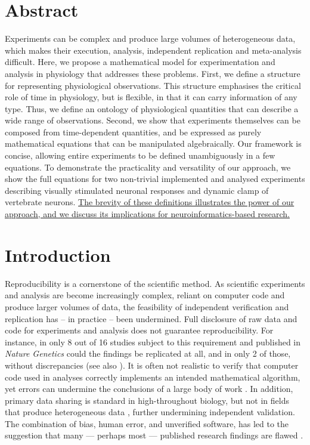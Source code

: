 
\section*{Abstract}

Experiments can be complex and produce large volumes of heterogeneous
data, which makes their execution, analysis, independent replication
and meta-analysis difficult. Here, we propose a mathematical model for
experimentation and analysis in physiology that addresses these
problems. First, we define a structure for representing physiological
observations. This structure emphasises the critical role of time in
physiology, but is flexible, in that it can carry information of any
type. Thus, we define an ontology of physiological quantities that can
describe a wide range of observations. Second, we show that
experiments themselves can be composed from time-dependent quantities,
and be expressed as purely mathematical equations that can be
manipulated algebraically. Our framework is concise, allowing entire
experiments to be defined unambiguously in a few equations. To
demonstrate the practicality and versatility of our approach, we show
the full equations for two non-trivial implemented and analysed
experiments describing visually stimulated neuronal responses and
dynamic clamp of vertebrate neurons. \underline{The brevity of these definitions
illustrates the power of our approach, and we discuss its implications
for neuroinformatics-based research.}

\pagebreak

\section*{Introduction}

Reproducibility is a cornerstone of the scientific method. As
scientific experiments and analysis are become increasingly complex,
reliant on computer code and produce larger volumes of data, the
feasibility of independent verification and replication has -- in
practice -- been undermined. Full disclosure of raw data and code for
experiments and analysis does not guarantee reproducibility.  For
instance, in only 8 out of 16 studies subject to this requirement and
published in \emph{Nature Genetics} could the findings be replicated
at all, and in only 2 of those, without discrepancies
\cite{Ioannidis2008} (see also \cite{Baggerly2009,
  McCullough2007}). It is often not realistic to verify that computer
code used in analyses correctly implements an intended mathematical
algorithm, yet errors can undermine the conclusions of a
large body of work \cite{Chang2006}.  In addition, primary data
sharing is standard in high-throughout biology, but
not in fields that produce heterogeneous data \cite{Gardner2005},
further undermining independent validation.  The combination
of bias, human error, and unverified software, has led to the
suggestion that many --- perhaps most --- published research findings
are flawed \cite{Ioannidis2005, Merali2010}.

